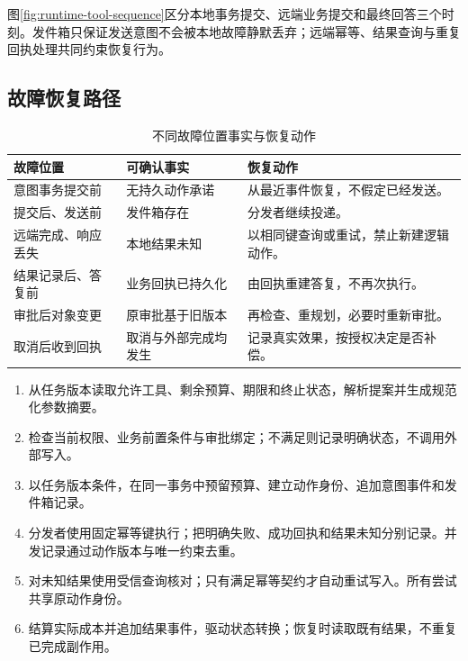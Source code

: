 \documentclass[../textbook.tex]{subfiles}
\begin{document}
\begin{example}[从执行结果生成业务回执]
图\ref{fig:runtime-tool-sequence}区分本地事务提交、远端业务提交和最终回答三个时刻。发件箱只保证发送意图不会被本地故障静默丢弃；远端幂等、结果查询与重复回执处理共同约束恢复行为。
\end{example}

\subsection{故障恢复路径}
\begin{table}[htbp]
\centering
\caption{不同故障位置事实与恢复动作}
\label{tab:agent-runtime-recovery}
\begin{tabularx}{\linewidth}{@{}p{.28\linewidth}p{.32\linewidth}X@{}}
\toprule
故障位置 & 可确认事实 & 恢复动作\\
\midrule
意图事务提交前 & 无持久动作承诺 & 从最近事件恢复，不假定已经发送。\\
提交后、发送前 & 发件箱存在 & 分发者继续投递。\\
远端完成、响应丢失 & 本地结果未知 & 以相同键查询或重试，禁止新建逻辑动作。\\
结果记录后、答复前 & 业务回执已持久化 & 由回执重建答复，不再次执行。\\
审批后对象变更 & 原审批基于旧版本 & 再检查、重规划，必要时重新审批。\\
取消后收到回执 & 取消与外部完成均发生 & 记录真实效果，按授权决定是否补偿。\\
\bottomrule
\end{tabularx}
\end{table}

\begin{algorithm}[受控动作提交与恢复]

\begin{enumerate}
\item 从任务版本读取允许工具、剩余预算、期限和终止状态，解析提案并生成规范化参数摘要。
\item 检查当前权限、业务前置条件与审批绑定；不满足则记录明确状态，不调用外部写入。
\item 以任务版本条件，在同一事务中预留预算、建立动作身份、追加意图事件和发件箱记录。
\item 分发者使用固定幂等键执行；把明确失败、成功回执和结果未知分别记录。并发记录通过动作版本与唯一约束去重。
\item 对未知结果使用受信查询核对；只有满足幂等契约才自动重试写入。所有尝试共享原动作身份。
\item 结算实际成本并追加结果事件，驱动状态转换；恢复时读取既有结果，不重复已完成副作用。
\end{enumerate}
\end{algorithm}
\end{document}
